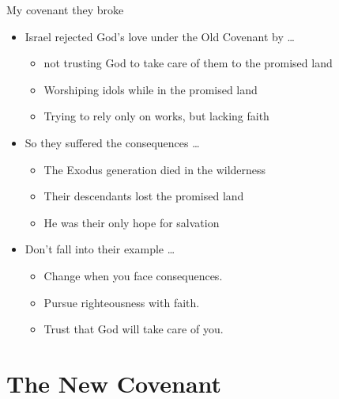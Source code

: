 \begin{frame}{My covenant they broke}
	\begin{itemize}
		\item Israel rejected God's love under the Old Covenant by \ldots
		\begin{itemize}
			\item not trusting God to take care of them to the promised land
			\item Worshiping idols while in the promised land
			\item Trying to rely only on works, but lacking faith
		\end{itemize}
		\item So they suffered the consequences \ldots
		\begin{itemize}
			\item The Exodus generation died in the wilderness
			\item Their descendants lost the promised land
			\item He was their only hope for salvation
		\end{itemize}
		\item Don't fall into their example \ldots
		\begin{itemize}
			\item Change when you face consequences.
			\item Pursue righteousness with faith.
			\item Trust that God will take care of you.
		\end{itemize}
	\end{itemize}
		
\end{frame}

\section{The New Covenant}

